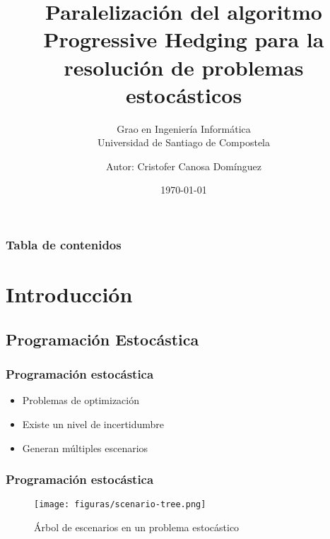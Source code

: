 \documentclass{beamer}
\begin{document}
\title{Paralelización del algoritmo Progressive Hedging para la resolución de problemas estocásticos}
\subtitle{Grao en Ingeniería Informática \\
Universidad de Santiago de Compostela}  
\author{Autor: Cristofer Canosa Domínguez}
\date{\today} 

\begin{frame}
\titlepage
\end{frame}

\begin{frame}
\frametitle{Tabla de contenidos}
\tableofcontents
\end{frame} 

\section{Introducción}

\subsection{Programación Estocástica}

\begin{frame}
    \frametitle{Programación estocástica}
    \begin{itemize}
        \item Problemas de optimización \pause
        \item Existe un nivel de incertidumbre \pause
        \item Generan múltiples escenarios
    \end{itemize}
\end{frame}

\begin{frame}
    \frametitle{Programación estocástica}
    \begin{figure}[H]
        \centerline{\texttt{[image: figuras/scenario-tree.png]}}
        \caption{Árbol de escenarios en un problema estocástico}
        \label{fig:scenario-tree}
    \end{figure}
\end{frame}
\end{document}
